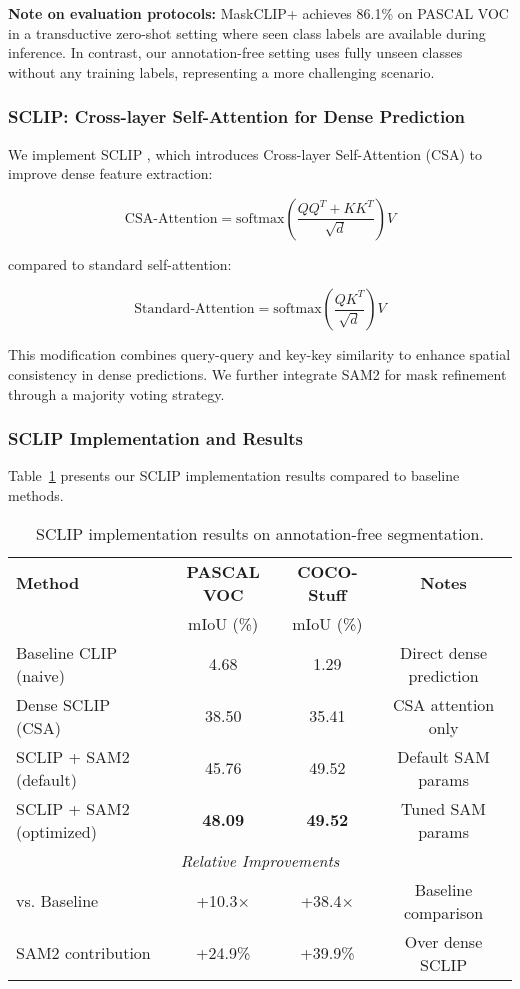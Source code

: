 \textbf{Note on evaluation protocols:} MaskCLIP+ achieves 86.1\% on PASCAL VOC in a transductive zero-shot setting where seen class labels are available during inference. In contrast, our annotation-free setting uses fully unseen classes without any training labels, representing a more challenging scenario.

\subsubsection{SCLIP: Cross-layer Self-Attention for Dense Prediction}

We implement SCLIP \cite{sclip2024}, which introduces Cross-layer Self-Attention (CSA) to improve dense feature extraction:

\begin{equation}
\text{CSA-Attention} = \text{softmax}\left(\frac{QQ^T + KK^T}{\sqrt{d}}\right)V
\end{equation}

compared to standard self-attention:

\begin{equation}
\text{Standard-Attention} = \text{softmax}\left(\frac{QK^T}{\sqrt{d}}\right)V
\end{equation}

This modification combines query-query and key-key similarity to enhance spatial consistency in dense predictions. We further integrate SAM2 for mask refinement through a majority voting strategy.

\subsubsection{SCLIP Implementation and Results}

Table~\ref{tab:sclip_results} presents our SCLIP implementation results compared to baseline methods.

\begin{table}[h]
\centering
\caption{SCLIP implementation results on annotation-free segmentation.}
\label{tab:sclip_results}
\begin{tabular}{lccc}
\hline
\textbf{Method} & \textbf{PASCAL VOC} & \textbf{COCO-Stuff} & \textbf{Notes} \\
 & mIoU (\%) & mIoU (\%) & \\
\hline
Baseline CLIP (naive) & 4.68 & 1.29 & Direct dense prediction \\
Dense SCLIP (CSA) & 38.50 & 35.41 & CSA attention only \\
SCLIP + SAM2 (default) & 45.76 & 49.52 & Default SAM params \\
SCLIP + SAM2 (optimized) & \textbf{48.09} & \textbf{49.52} & Tuned SAM params \\
\hline
\multicolumn{4}{c}{\textit{Relative Improvements}} \\
\hline
vs. Baseline & +10.3$\times$ & +38.4$\times$ & Baseline comparison \\
SAM2 contribution & +24.9\% & +39.9\% & Over dense SCLIP \\
\hline
\end{tabular}
\end{table}

